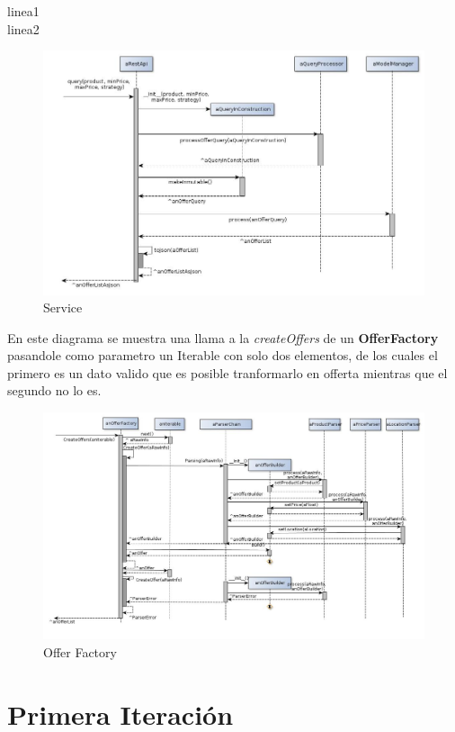 \documentclass[10pt, a4paper]{article}
\begin{document}
\begin{landscape}
\newpage
linea1\\
linea2\\
\begin{figure}[H]
\centering
\includegraphics[scale=0.70]{graphics/service_sequence.jpg}
\caption{Service}
\end{figure}
\newpage
En este diagrama se muestra una llama a la \emph{createOffers} de un \textbf{OfferFactory} pasandole como parametro un Iterable con solo dos elementos, de los cuales el primero es un dato valido que es posible tranformarlo en offerta mientras que el segundo no lo es.
\begin{figure}[H]
\centering
\includegraphics[scale=0.60]{graphics/OfferFactory_sequence.jpg}
\caption{Offer Factory}
\end{figure}

\end{landscape}

\section{Primera Iteración}
\end{document}
